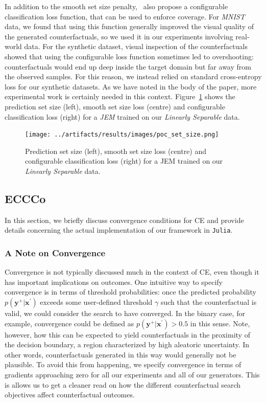 \documentclass{article}
\begin{document}
In addition to the smooth set size penalty,~\citet{stutz2022learning} also propose a configurable classification loss function, that can be used to enforce coverage. For \textit{MNIST} data, we found that using this function generally improved the visual quality of the generated counterfactuals, so we used it in our experiments involving real-world data. For the synthetic dataset, visual inspection of the counterfactuals showed that using the configurable loss function sometimes led to overshooting: counterfactuals would end up deep inside the target domain but far away from the observed samples. For this reason, we instead relied on standard cross-entropy loss for our synthetic datasets. As we have noted in the body of the paper, more experimental work is certainly needed in this context. Figure~\ref{fig:cp-diff} shows the prediction set size (left), smooth set size loss (centre) and configurable classification loss (right) for a \textit{JEM} trained on our \textit{Linearly Separable} data.

\begin{figure}
  \centering
  \texttt{[image: ../artifacts/results/images/poc\_set\_size.png]}
  \caption{Prediction set size (left), smooth set size loss (centre) and configurable classification loss (right) for a JEM trained on our \textit{Linearly Separable} data.}\label{fig:cp-diff}
\end{figure}

\subsection{ECCCo}\label{app:eccco}

In this section, we briefly discuss convergence conditions for CE and provide details concerning the actual implementation of our framework in \texttt{Julia}.  
\subsubsection{A Note on Convergence}

Convergence is not typically discussed much in the context of CE, even though it has important implications on outcomes. One intuitive way to specify convergence is in terms of threshold probabilities: once the predicted probability $p(\mathbf{y}^+|\mathbf{x}^{\prime})$ exceeds some user-defined threshold $\gamma$ such that the counterfactual is valid, we could consider the search to have converged. In the binary case, for example, convergence could be defined as $p(\mathbf{y}^+|\mathbf{x}^{\prime})>0.5$ in this sense. Note, however, how this can be expected to yield counterfactuals in the proximity of the decision boundary, a region characterized by high aleatoric uncertainty. In other words, counterfactuals generated in this way would generally not be plausible. To avoid this from happening, we specify convergence in terms of gradients approaching zero for all our experiments and all of our generators. This is allows us to get a cleaner read on how the different counterfactual search objectives affect counterfactual outcomes. 
\end{document}
